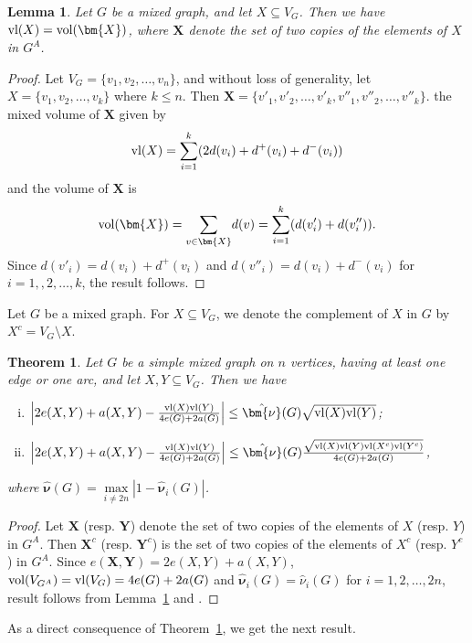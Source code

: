 \documentclass[12pt]{article}
\numberwithin{equation}{section}
\newtheorem{thm}{Theorem}[section]
\newtheorem{lemma}{Lemma}[section]
\begin{document}
	\begin{lemma}\label{volume}
		Let $G$ be a mixed graph, and let $X\subseteq V_G$. Then we have $\textnormal{vl}(X)=\textnormal{vol}(\bm{X})$, where $\bm{X}$ denote the set of two copies of the elements of $X$ in $G^A$.
	\end{lemma}
	\begin{proof}
		Let $V_G=\{v_1,v_2,\ldots,v_n\}$, and without loss of generality, let $X=\{v_1,v_2,\ldots,v_k\}$ where $k\leq n$. Then $\bm{X}=\{v'_1,v'_2,\ldots,v'_k,v''_1,v''_2,\ldots,v''_k\}$. the mixed volume of $\bm{X}$ given by $$\textnormal{vl}(X)=\overset{k}{\underset{i=1}{\sum}}(2d(v_i)+d^+(v_i)+d^-(v_i))$$ and the volume of $\bm{X}$ is $$\textnormal{vol}(\bm{X})=\underset{v\in \bm{X}}{\sum}d(v)=\overset{k}{\underset{i=1}{\sum}}(d(v'_i)+d(v''_i)).$$ Since $d(v'_i)=d(v_i)+d^+(v_i)$ and $d(v''_i)=d(v_i)+d^-(v_i)$ for $i=1,,2,\ldots,k$, the result follows. 
	\end{proof}
	Let $G$ be a mixed graph. For $X\subseteq V_G$, we denote the complement of $X$ in $G$ by $X^c=V_G\setminus X$.
	\begin{thm}\label{eXY}
		Let $G$ be a simple mixed graph on $n$ vertices, having at least one edge or one arc, and let $X,Y\subseteq V_G$. Then we have
		\begin{enumerate}[(i)]
			\item $\left|2e(X,Y)+a(X,Y)-\frac{\textnormal{vl}(X)\textnormal{vl}(Y)}{4e(G)+2a(G)}\right|\leq \hat{\bm{\nu}}(G)\sqrt{\textnormal{vl}(X)\textnormal{vl}(Y)}$;
			\item $\left|2e(X,Y)+a(X,Y)-\frac{\textnormal{vl}(X)\textnormal{vl}(Y)}{4e(G)+2a(G)}\right|\leq \hat{\bm{\nu}}(G)\frac{\sqrt{\textnormal{vl}(X)\textnormal{vl}(Y)\textnormal{vl}(X^c)\textnormal{vl}(Y^c)}}{4e(G)+2a(G)}$,
		\end{enumerate}  where $\hat{\bm{\nu}}(G)=\underset{i\neq 2n}{\max}|1-\hat{\bm{\nu}}_i(G)|$.  
	\end{thm}
	\begin{proof}
		Let $\bm{X}$ (resp. $\bm{Y}$) denote the set of two copies of the elements of $X$ (resp. $Y$) in $G^A$. 
		Then $\bm{X}^c$ (resp. $\bm{Y}^c$) is the set of two copies of the elements of $X^c$ (resp. $Y^c$) in $G^A$. Since $e(\bm{X},\bm{Y})=2e(X,Y)+a(X,Y)$,  $\textnormal{vol}(V_{G^A})=\textnormal{vl}(V_G)=4e(G)+2a(G)$ and $\hat{\bm{\nu}}_i(G)=\hat{\nu}_i(G)$ for $i=1,2,\ldots,2n$, result follows from Lemma~\ref{volume} and \cite[Theorems~5.1 and 5.2]{chung}. 
	\end{proof}
	As a direct consequence of Theorem~\ref{eXY}, we get the next result.
\end{document}
